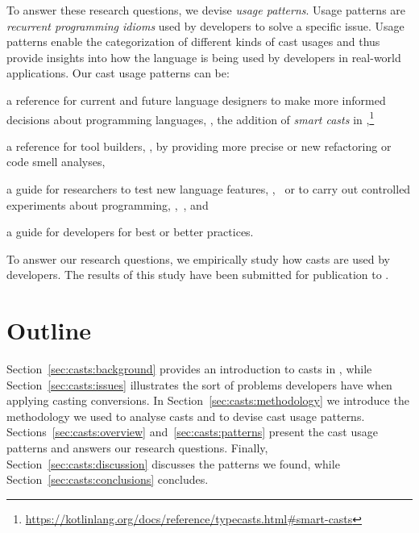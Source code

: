 To answer these research questions, we devise
\emph{usage patterns}.
Usage patterns are \emph{recurrent programming idioms} used by developers to solve a specific issue.
Usage patterns enable the categorization of different kinds of cast usages and
thus provide insights into how the language is being used by developers in real-world applications.
Our cast usage patterns can be:
\begin{inparaenum}[(1)]
\item a reference for current and future language designers
to make more informed decisions about programming languages,
\eg{},
the addition of \emph{smart casts} in ,\footnote{\url{https://kotlinlang.org/docs/reference/typecasts.html\#smart-casts}}
\item a reference for tool builders, \eg{}, by providing more precise or new
  refactoring or code smell analyses,
\item a guide for researchers to test new language features, \eg{},~\cite{wintherGuardedTypePromotion2011} or to carry out controlled
  experiments about programming, \eg{},~\cite{stuchlikStaticVsDynamic2011}, and
\item a guide for developers for best or better practices.
\end{inparaenum}
To answer our research questions,
we empirically study how casts are used by developers.
The results of this study have been submitted for publication to .


\section*{Outline}

Section~\ref{sec:casts:background} provides an introduction to casts in \java{},
while Section~\ref{sec:casts:issues} illustrates the sort of problems developers have when applying casting conversions.
In Section~\ref{sec:casts:methodology} we introduce the methodology we used to analyse casts and to devise cast usage patterns.
Sections~\ref{sec:casts:overview} and~\ref{sec:casts:patterns} present the cast usage patterns and answers our research questions.
Finally, Section~\ref{sec:casts:discussion} discusses the patterns we found,
while Section~\ref{sec:casts:conclusions} concludes.











